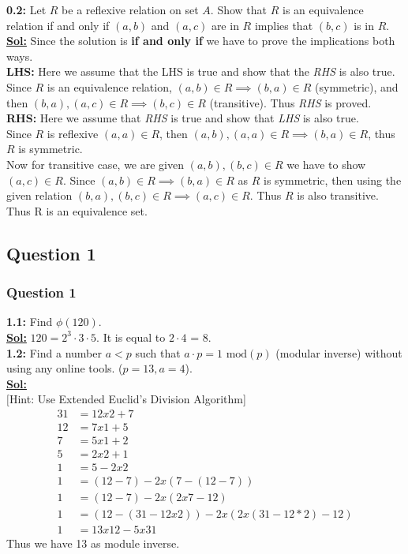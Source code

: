 \documentclass[xcolor=svgnames]{beamer}
\begin{document}
\begin{frame}{}
        \textbf{0.2:} Let $R$ be a reflexive relation on set $A$. Show that $R$ is an equivalence relation if and only if $(a, b)$ and $(a, c)$ are in $R$ implies that $(b,c)$ is in $R$. \\
        \textbf{\underline{Sol:}} Since the solution is \textbf{if and only if} we have to prove the implications both ways. \\
        \textbf{LHS:} Here we assume that the LHS is true and show that the \textit{RHS} is also true. \\
        Since $R$ is an equivalence relation, $(a, b) \in R \implies (b, a) \in R$ (symmetric), and then $(b,a), (a,c) \in R \implies (b,c) \in R$ (transitive). Thus \textit{RHS} is proved. \\
        \textbf{RHS:} Here we assume that \textit{RHS} is true and show that \textit{LHS} is also true. \\
        Since $R$ is reflexive $(a,a) \in R$, then $(a,b), (a, a) \in R \implies (b,a) \in R$, thus $R$ is symmetric. \\ 
        Now for transitive case, we are given $(a,b), (b,c) \in R$  we have to show $(a,c) \in R$. Since $(a, b) \in R \implies (b, a) \in R$ as $R$ is symmetric, then using the given relation $(b, a), (b,c) \in R \implies (a, c) \in R$. Thus $R$ is also transitive. Thus R is an equivalence set.
\end{frame}


\subsection{Question 1}
\begin{frame}
\frametitle{Question 1}
\textbf{1.1: } Find $\phi (120)$.
\\ \textbf{\underline{Sol:}} $120 = 2^3 \cdot 3 \cdot 5$. It is equal to $2 \cdot 4$ = 8.
\\ \textbf{1.2: } Find a number $a < p$ such that $a \cdot p = 1 \text{ mod}(p)$ (modular inverse) without using any  online tools. ($p = 13, a = 4$). 
\\ 
\footnotesize{\textbf{\underline{Sol:}} 
\\ $[$Hint: Use Extended Euclid's Division Algorithm]
        \begin{align*}
        31 &= 12 x 2 + 7
        \\12 &= 7 x 1 + 5 
        \\ 7 &= 5 x 1 + 2
        \\ 5 &= 2 x 2 + 1
        \\ 1 &= 5 - 2 x 2
        \\ 1 &= (12 - 7) - 2 x (7  - (12 - 7))
        \\ 1 &= (12 - 7) - 2 x (2 x 7 - 12)
        \\ 1 &= (12 - (31 - 12 x 2)) -  2 x(2 x (31 - 12*2) - 12)
        \\ 1&= 13 x 12 - 5 x 31
        \end{align*}
        Thus we have 13 as module inverse.
}
\end{frame}
\end{document}
